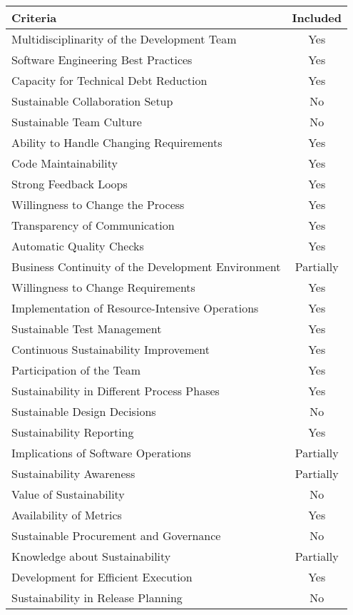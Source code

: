 \begin{longtable}{ |l|c| }
\hline
\textbf{Criteria} & \textbf{Included}\\
\hline
Multidisciplinarity of the Development Team & Yes\\
\hline
Software Engineering Best Practices & Yes\\
\hline
Capacity for Technical Debt Reduction & Yes\\
\hline
Sustainable Collaboration Setup & No \\
\hline
Sustainable Team Culture & No\\
\hline
Ability to Handle Changing Requirements & Yes\\
\hline
Code Maintainability & Yes\\
\hline
Strong Feedback Loops & Yes\\
\hline
Willingness to Change the Process & Yes\\
\hline
Transparency of Communication & Yes \\
\hline
Automatic Quality Checks & Yes\\
\hline
Business Continuity of the Development Environment & Partially\\
\hline
Willingness to Change Requirements & Yes\\
\hline
Implementation of Resource-Intensive Operations & Yes\\
\hline
Sustainable Test Management & Yes\\
\hline
Continuous Sustainability Improvement & Yes\\
\hline
Participation of the Team & Yes\\
\hline
Sustainability in Different Process Phases & Yes\\
\hline
Sustainable Design Decisions & No\\
\hline
Sustainability Reporting & Yes\\
\hline
Implications of Software Operations & Partially\\
\hline
Sustainability Awareness & Partially\\
\hline
Value of Sustainability & No\\
\hline
Availability of Metrics & Yes\\
\hline
Sustainable Procurement and Governance & No\\
\hline
Knowledge about Sustainability & Partially\\
\hline
Development for Efficient Execution & Yes\\
\hline
Sustainability in Release Planning & No\\

\end{longtable}
